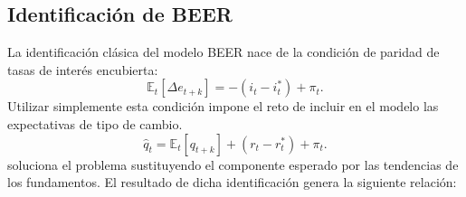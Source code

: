 \documentclass[12pt,letterpaper]{article}
\begin{document}
\subsection*{Identificación de BEER}

La identificación clásica del modelo BEER nace de la condición de paridad de tasas de interés encubierta:
\begin{equation}
\mathbb{E}_t[\Delta e_{t+k}]=-(i_t-i_t^*)+\pi_t.
\end{equation}
Utilizar simplemente esta condición impone el reto de incluir en el modelo las expectativas de tipo de cambio. 
\begin{equation}
\hat{q}_t=\mathbb{E}_t[q_{t+k}]+(r_t-r_t^*)+\pi_t.
\end{equation}
\cite{clark1999exchange} soluciona el problema sustituyendo el componente esperado por las tendencias de los fundamentos. El resultado de dicha identificación genera la siguiente relación:

\end{document}
